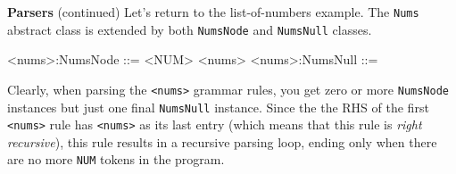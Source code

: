 \begin{minipage}[t]{\sw}
\slidenumber
\LARGE
{\bf Parsers} (continued)\exx
Let's return to the list-of-numbers example.\exx
\Large
\emm\LightBox{\MYlonGrammarTOK}\exx
\LARGE
The \verb'Nums' abstract class is extended
by both \verb'NumsNode' and \verb'NumsNull' classes.
\Large
\begin{qv}
<nums>:NumsNode ::= <NUM> <nums>
<nums>:NumsNull ::=
\end{qv}
\LARGE
Clearly, when parsing the \verb'<nums>' grammar rules,
you get zero or more \verb'NumsNode' instances
but just one final \verb'NumsNull' instance.
Since the the RHS of the first \verb'<nums>' rule
has \verb'<nums>' as its last entry
(which means that this rule is {\em right recursive}),
this rule results in a recursive parsing loop,
ending only when there are no more \verb'NUM' tokens in the program.\exx
\end{minipage}
\clearpage
